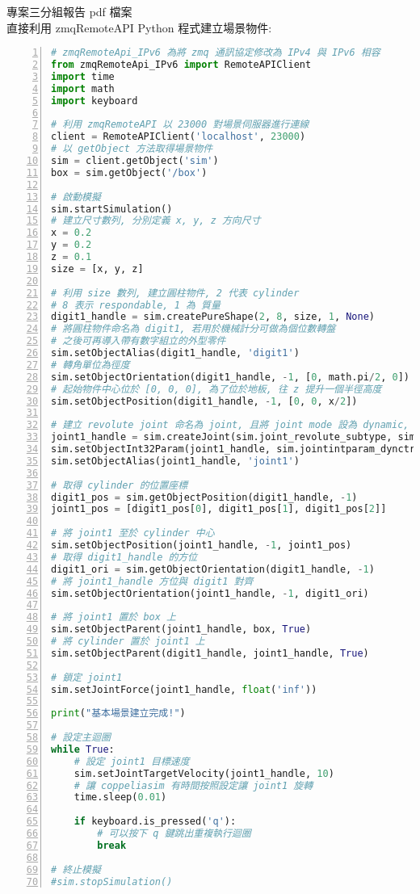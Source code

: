專案三分組報告 pdf 檔案\\

直接利用 zmqRemoteAPI Python 程式建立場景物件:\\
\begin{lstlisting}[language=Python, frame=single, numbers=left, captionpos=b, basicstyle=\ttfamily\small, showstringspaces=false, breaklines=true, tabsize=4, xleftmargin=15pt]
# zmqRemoteApi_IPv6 為將 zmq 通訊協定修改為 IPv4 與 IPv6 相容
from zmqRemoteApi_IPv6 import RemoteAPIClient
import time
import math
import keyboard
 
# 利用 zmqRemoteAPI 以 23000 對場景伺服器進行連線
client = RemoteAPIClient('localhost', 23000)
# 以 getObject 方法取得場景物件
sim = client.getObject('sim')
box = sim.getObject('/box')
 
# 啟動模擬
sim.startSimulation()
# 建立尺寸數列, 分別定義 x, y, z 方向尺寸
x = 0.2
y = 0.2
z = 0.1
size = [x, y, z]
 
# 利用 size 數列, 建立圓柱物件, 2 代表 cylinder
# 8 表示 respondable, 1 為 質量
digit1_handle = sim.createPureShape(2, 8, size, 1, None)
# 將圓柱物件命名為 digit1, 若用於機械計分可做為個位數轉盤
# 之後可再導入帶有數字組立的外型零件
sim.setObjectAlias(digit1_handle, 'digit1')
# 轉角單位為徑度
sim.setObjectOrientation(digit1_handle, -1, [0, math.pi/2, 0])
# 起始物件中心位於 [0, 0, 0], 為了位於地板, 往 z 提升一個半徑高度
sim.setObjectPosition(digit1_handle, -1, [0, 0, x/2])
 
# 建立 revolute joint 命名為 joint, 且將 joint mode 設為 dynamic, control mode 設為 velocity
joint1_handle = sim.createJoint(sim.joint_revolute_subtype, sim.jointmode_dynamic, 0, None)
sim.setObjectInt32Param(joint1_handle, sim.jointintparam_dynctrlmode, sim.jointdynctrl_velocity)
sim.setObjectAlias(joint1_handle, 'joint1')
 
# 取得 cylinder 的位置座標
digit1_pos = sim.getObjectPosition(digit1_handle, -1)
joint1_pos = [digit1_pos[0], digit1_pos[1], digit1_pos[2]]
 
# 將 joint1 至於 cylinder 中心
sim.setObjectPosition(joint1_handle, -1, joint1_pos)
# 取得 digit1_handle 的方位
digit1_ori = sim.getObjectOrientation(digit1_handle, -1)
# 將 joint1_handle 方位與 digit1 對齊
sim.setObjectOrientation(joint1_handle, -1, digit1_ori)
 
# 將 joint1 置於 box 上
sim.setObjectParent(joint1_handle, box, True)
# 將 cylinder 置於 joint1 上
sim.setObjectParent(digit1_handle, joint1_handle, True)
 
# 鎖定 joint1
sim.setJointForce(joint1_handle, float('inf'))
 
print("基本場景建立完成!")
 
# 設定主迴圈
while True:
    # 設定 joint1 目標速度
    sim.setJointTargetVelocity(joint1_handle, 10)
    # 讓 coppeliasim 有時間按照設定讓 joint1 旋轉
    time.sleep(0.01) 
 
    if keyboard.is_pressed('q'):
        # 可以按下 q 鍵跳出重複執行迴圈
        break
 
# 終止模擬
#sim.stopSimulation()
\end{lstlisting}
